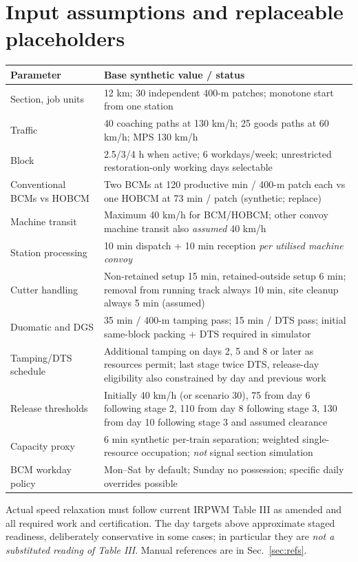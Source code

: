 \documentclass[10pt,a4paper]{article}
\begin{document}
\section{Input assumptions and replaceable placeholders}
\begin{center}\small
\begin{tabular}{p{.42\linewidth}p{.49\linewidth}}\toprule
Parameter & Base synthetic value / status\\\midrule
Section, job units & 12 km; 30 independent 400-m patches; monotone start from one station\\
Traffic & 40 coaching paths at 130 km/h; 25 goods paths at 60 km/h; MPS 130 km/h\\
Block & 2.5/3/4 h when active; 6 workdays/week; unrestricted restoration-only working days selectable\\
Conventional BCMs vs HOBCM & Two BCMs at 120 productive min / 400-m patch each vs one HOBCM at 73 min / patch (synthetic; replace)\\
Machine transit & Maximum 40 km/h for BCM/HOBCM; other convoy machine transit also \emph{assumed} 40 km/h\\
Station processing & 10 min dispatch + 10 min reception \emph{per utilised machine convoy}\\
Cutter handling & Non-retained setup 15 min, retained-outside setup 6 min; removal from running track always 10 min, site cleanup always 5 min (assumed)\\
Duomatic and DGS & 35 min / 400-m tamping pass; 15 min / DTS pass; initial same-block packing + DTS required in simulator\\
Tamping/DTS schedule & Additional tamping on days 2, 5 and 8 or later as resources permit; last stage twice DTS, release-day eligibility also constrained by day and previous work\\
Release thresholds & Initially 40 km/h (or scenario 30), 75 from day 6 following stage 2, 110 from day 8 following stage 3, 130 from day 10 following stage 3 and assumed clearance\\
Capacity proxy & 6 min synthetic per-train separation; weighted single-resource occupation; \emph{not} signal section simulation\\
BCM workday policy & Mon--Sat by default; Sunday no possession; specific daily overrides possible\\\bottomrule
\end{tabular}\end{center}
Actual speed relaxation must follow current IRPWM Table III as amended and all required work and certification. The day targets above approximate staged readiness, deliberately conservative in some cases; in particular they are \emph{not a substituted reading of Table III}. Manual references are in Sec.~\ref{sec:refs}.
\end{document}
